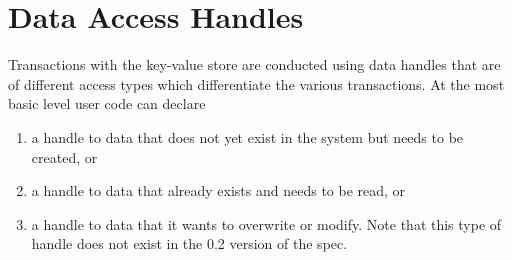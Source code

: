%
%
%
%
%
%
%
%



\section{Data Access Handles}
\label{sec:handles}


Transactions with the \gls{key-value store} are conducted using data handles 
that are of different access types which differentiate the various transactions. 
At the most basic level user code can declare 
\begin{enumerate}
\item a handle to data that does not yet exist in the system
but needs to be created, or
\item a handle to data that already exists and needs to
be read, or 
\item a handle to data that it wants to overwrite or modify. 
Note that this type of handle does not exist in the 0.2 version of the spec.
\end{enumerate}

